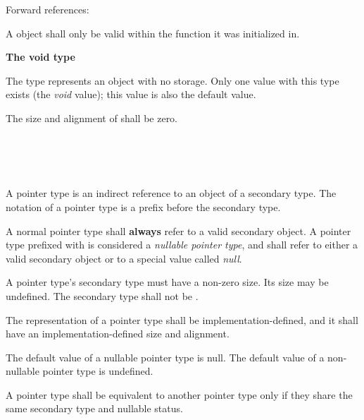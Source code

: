 Forward references: 

\specsubsubitem
A  object shall only be valid within the function it was
initialized in.

\textbf{The void type}

\specsubsubitem
The  type represents an object with no storage. Only one value
with this type exists (the \textit{void} value); this value is also the default
value.

\specsubsubitem
The size and alignment of  shall be zero.


\begin{grammar}
 \\
	\terminal{*}  \\
	 \terminal{*}  \\
\end{grammar}

\specsubsubitem
A pointer type is an indirect reference to an object of a secondary type. The
notation of a pointer type is a \terminal{*} prefix before the secondary type.

\specsubsubitem
A normal pointer type shall \textbf{always} refer to a valid secondary object.
A pointer type prefixed with  is considered a
\textit{nullable pointer type}, and shall refer to either a valid secondary object
or to a special value called \textit{null}.

\specsubsubitem
A pointer type's secondary type must have a non-zero size. Its size may be
undefined. The secondary type shall not be .

\specsubsubitem
The representation of a pointer type shall be implementation-defined, and it
shall have an implementation-defined size and alignment.

\specsubsubitem
The default value of a nullable pointer type is null. The default value of a
non-nullable pointer type is undefined.

\specsubsubitem
A pointer type shall be equivalent to another pointer type only if they share
the same secondary type and nullable status.



